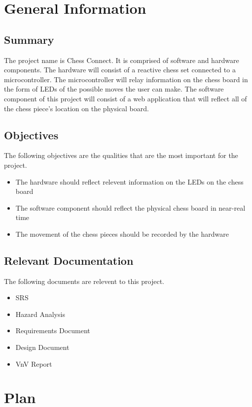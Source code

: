 \documentclass[12pt, titlepage]{article}
\begin{document}
\section{General Information}

\subsection{Summary}
The project name is Chess Connect. It is comprised of software and hardware components. The hardware will consist of a reactive chess set 
connected to a microcontroller. The microcontroller will relay information on the chess board in the form of LEDs of the possible moves the user can make.
The software component of this project will consist of a web application that will reflect all of the chess piece's location on the physical board.

\subsection{Objectives}
The following objectives are the qualities that are the most important for the project.
\begin{itemize}
  \item The hardware should reflect relevent information on the LEDs on the chess board
  \item The software component should reflect the physical chess board in near-real time
  \item The movement of the chess pieces should be recorded by the hardware
\end{itemize}

\subsection{Relevant Documentation}
The following documents are relevent to this project.
\begin{itemize}
  \item SRS
  \item Hazard Analysis
  \item Requirements Document
  \item Design Document
  \item VnV Report
\end{itemize}

\section{Plan}
\end{document}
